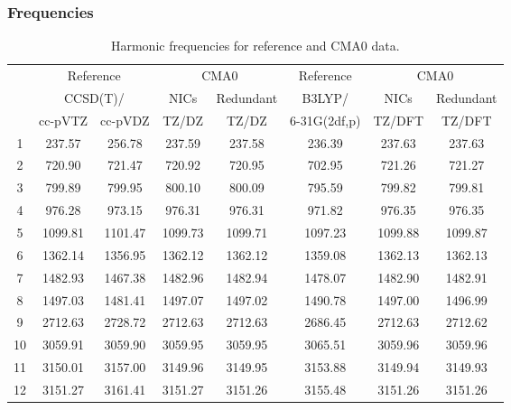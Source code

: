 \documentclass[10pt,oneside]{article}
\begin{document}
\begin{table}[h!]
\subsubsection*{Frequencies}
\centering
\caption{Harmonic frequencies for reference and CMA0 data.}
\begin{tabular}{cccccccc}
\toprule
{} & \multicolumn{2}{c}{Reference} & \multicolumn{2}{c}{CMA0} &    Reference & \multicolumn{2}{c}{CMA0} \\
{} & \multicolumn{2}{c}{CCSD(T)/} &    NICs &  Redundant &       B3LYP/ &    NICs & Redundant \\
{} &   cc-pVTZ & cc-pVDZ &   TZ/DZ &      TZ/DZ & 6-31G(2df,p) &  TZ/DFT &    TZ/DFT \\
\midrule
1  &    237.57 &  256.78 &  237.59 &     237.58 &       236.39 &  237.63 &    237.63 \\
2  &    720.90 &  721.47 &  720.92 &     720.95 &       702.95 &  721.26 &    721.27 \\
3  &    799.89 &  799.95 &  800.10 &     800.09 &       795.59 &  799.82 &    799.81 \\
4  &    976.28 &  973.15 &  976.31 &     976.31 &       971.82 &  976.35 &    976.35 \\
5  &   1099.81 & 1101.47 & 1099.73 &    1099.71 &      1097.23 & 1099.88 &   1099.87 \\
6  &   1362.14 & 1356.95 & 1362.12 &    1362.12 &      1359.08 & 1362.13 &   1362.13 \\
7  &   1482.93 & 1467.38 & 1482.96 &    1482.94 &      1478.07 & 1482.90 &   1482.91 \\
8  &   1497.03 & 1481.41 & 1497.07 &    1497.02 &      1490.78 & 1497.00 &   1496.99 \\
9  &   2712.63 & 2728.72 & 2712.63 &    2712.63 &      2686.45 & 2712.63 &   2712.62 \\
10 &   3059.91 & 3059.90 & 3059.95 &    3059.95 &      3065.51 & 3059.96 &   3059.96 \\
11 &   3150.01 & 3157.00 & 3149.96 &    3149.95 &      3153.88 & 3149.94 &   3149.93 \\
12 &   3151.27 & 3161.41 & 3151.27 &    3151.26 &      3155.48 & 3151.26 &   3151.26 \\
\bottomrule
\end{tabular}
\end{table}
\end{document}
